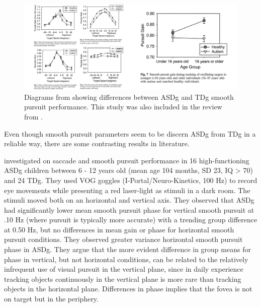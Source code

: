 \begin{figure}[h]
  \centering
  \includegraphics[width=1\textwidth]{figures/takaraemoothdifferences-02.jpg}
  \caption[Pursuit anomalies in ASDg]{Diagrams from \cite{takarae2004smoothpursuit} showing differences between ASDg and TDg smooth pursuit performance. This study was also included in the review from \cite{johnson2016review}.}
  \label{fig:pursuitASDg}
\end{figure}

Even though smooth pursuit parameters seem to be discern ASDg from TDg in a reliable way, there are some contrasting results in literature.

\cite{wilkes2015oculomotor} investigated on saccade and smooth pursuit performance in 16 high-functioning ASDg children between 6 - 12 years old (mean age 104 months, SD 23, IQ > 70) and 24 TDg. They used VOG goggles (I-Portal/Neuro-Kinetics, 100 Hz) to record eye movements while presenting a red laser-light as stimuli in a dark room. The stimuli moved both on an horizontal and vertical axis. They observed that ASDg had significantly lower mean smooth pursuit phase for vertical smooth pursuit at .10 Hz (where pursuit is typically more accurate) with a trending group difference at 0.50 Hz, but no differences in mean gain or phase for horizontal smooth pursuit conditions. They observed greater variance horizontal smooth pursuit phase in ASDg. They argue that the more evident difference in group means for phase in vertical, but not horizontal conditions, can be related to the relatively infrequent use of visual pursuit in the vertical plane, since in daily experience tracking objects continuously in the vertical plane is more rare than tracking objects in the horizontal plane. Differences in phase implies that the fovea is not on target but in the periphery.

